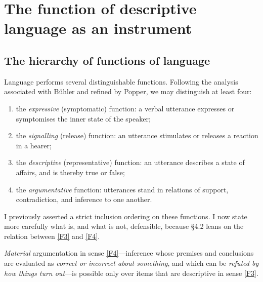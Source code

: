 \documentclass[12pt]{article}
\begin{document}
\section{The function of descriptive language as an instrument}

\subsection{The hierarchy of functions of language}

Language performs several distinguishable functions. Following the
analysis associated with B\"uhler and refined by Popper, we may
distinguish at least four:

\begin{enumerate}[label=(F\arabic*),leftmargin=2.4em]
\item\label{F1} the \emph{expressive} (symptomatic) function: a verbal
utterance expresses or symptomises the inner state of the speaker;
\item\label{F2} the \emph{signalling} (release) function: an utterance
stimulates or releases a reaction in a hearer;
\item\label{F3} the \emph{descriptive} (representative) function: an
utterance describes a state of affairs, and is thereby true or false;
\item\label{F4} the \emph{argumentative} function: utterances stand in
relations of support, contradiction, and inference to one another.
\end{enumerate}

I previously asserted a strict inclusion ordering on these functions. I
now state more carefully what is, and what is not, defensible, because
\S4.2 leans on the relation between \ref{F3} and \ref{F4}.

\begin{description}[leftmargin=1.6em,style=nextline]
\item[Lemma 0 (Dependence of contentful inference on description).]
\emph{Material} argumentation in sense \ref{F4}---inference whose premises
and conclusions are evaluated as \emph{correct or incorrect about
something}, and which can be \emph{refuted by how things turn out}---is
possible only over items that are descriptive in sense \ref{F3}.
\end{description}
\end{document}
